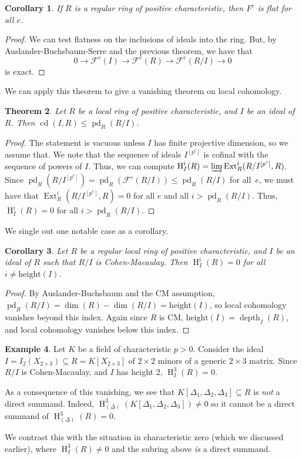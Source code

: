 \documentclass[11pt]{book}
\newtheorem{theorem}{Theorem}[chapter]
\newtheorem{corollary}[theorem]{Corollary}
\numberwithin{equation}{section}
\numberwithin{theorem}{chapter}
\theoremstyle{definition}
\newtheorem{example}[theorem]{Example}
\newtheorem*{basic properties}{Basic Properties}
\newtheorem*{Important Remark}{Important Remark}
\theoremstyle{remark}
\newcommand{\cF}{\mathcal{F}}
\newcommand{\Ext}{\operatorname{Ext}}
\DeclareMathOperator{\cd}{cd}
\renewcommand{\dim}{\operatorname{dim}}
\newcommand{\depth}{\operatorname{depth}}
\newcommand{\pd}{\operatorname{pd}}
\renewcommand{\H}{\operatorname{H}}
\begin{document}
\begin{corollary}
	If $R$ is a regular ring of positive characteristic, then $F^e$ is flat for all $e$.
\end{corollary}
\begin{proof}
We can test flatness on the inclusions of ideals into the ring. But, by Auslander-Buchsbaum-Serre and the previous theorem, we have that \[ 0 \to \cF^e(I) \to \cF^e(R) \to \cF^e(R/I) \to 0\]
is exact.
\end{proof}

We can apply this theorem to give a vanishing theorem on local cohomology.

\begin{theorem}
	Let $R$ be a local ring of positive characteristic, and $I$ be an ideal of $R$. Then $\cd(I,R)\leq \pd_R (R/I)$.
\end{theorem}
\begin{proof}
	The statement is vacuous unless $I$ has finite projective dimension, so we assume that. We note that the sequence of ideals $I^{[p^e]}$ is cofinal with the sequence of powers of $I$. Thus, we can compute $\H^i_I(R)=\varinjlim \Ext^i_R(R/I^{[p^e]},R)$. Since $\pd_R(R/I^{[p^e]})=\pd_R(\cF^e(R/I))\leq\pd_R(R/I)$ for all~$e$, we must have that $\Ext^i_R(R/I^{[p^e]},R)=0$ for all $e$ and all $i>\pd_R(R/I)$. Thus, $\H^i_I(R)=0$ for all $i>\pd_R(R/I)$.
\end{proof}

We single out one notable case as a corollary.

\begin{corollary}
	Let $R$ be a regular local ring of positive characteristic, and $I$ be an ideal of $R$ such that $R/I$ is Cohen-Macaulay. Then $\H^i_I(R)=0$ for all $i\neq \mathrm{height}(I)$.
\end{corollary}
\begin{proof}
	By Auslander-Buchsbaum and the CM assumption, $\pd_R(R/I)=\dim(R)-\dim(R/I)=\mathrm{height}(I)$, so local cohomology vanishes beyond this index. Again since $R$ is CM, $\mathrm{height}(I)=\depth_I(R)$, and local cohomology vanishes below this index.
\end{proof}

\begin{example}
	Let $K$ be a field of characteristic $p>0$. Consider the ideal $I=I_2(X_{2\times 3})\subseteq R=K[X_{2\times 3}]$ of $2\times 2$ minors of a generic $2\times 3$ matrix. Since $R/I$ is Cohen-Macaulay, and $I$ has height 2, $\H^3_I(R)=0$.
	
	As a consequence of this vanishing, we see that $K[\Delta_1,\Delta_2,\Delta_3] \subseteq  R$ is \emph{not} a direct summand. Indeed, $\H^3_{(\underline{\Delta})}(K[\Delta_1,\Delta_2,\Delta_3])\neq 0$ so it cannot be a direct summand of $\H^3_{(\underline{\Delta})}(R)=0$. 
	
	We contrast this with the situation in characteristic zero (which we discussed earlier), where $\H^3_I(R)\neq 0$ and the subring above \emph{is} a direct summand.
\end{example}
\end{document}
